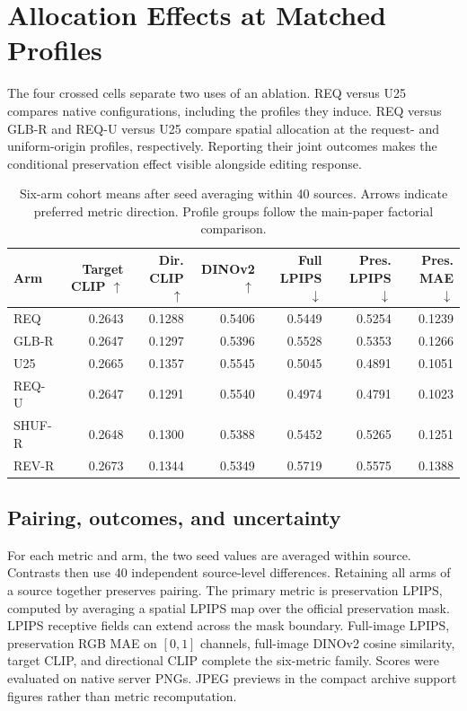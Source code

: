 \documentclass[10pt,doubleanonymous]{ieeeconf}
\begin{document}
\section{Allocation Effects at Matched Profiles}
The four crossed cells separate two uses of an ablation. REQ versus U25 compares native configurations, including the profiles they induce. REQ versus GLB-R and REQ-U versus U25 compare spatial allocation at the request- and uniform-origin profiles, respectively. Reporting their joint outcomes makes the conditional preservation effect visible alongside editing response.
\begin{table}[!t]
\centering\small
\caption{Six-arm cohort means after seed averaging within 40 sources. Arrows indicate preferred metric direction. Profile groups follow the main-paper factorial comparison.}
\label{tab:main-means}
\begin{tabular}{lrrrrrr}
\toprule
Arm & Target CLIP $\uparrow$ & Dir. CLIP $\uparrow$ & DINOv2 $\uparrow$ & Full LPIPS $\downarrow$ & Pres. LPIPS $\downarrow$ & Pres. MAE $\downarrow$\\
\midrule
REQ &0.2643&0.1288&0.5406&0.5449&0.5254&0.1239\\
GLB-R &0.2647&0.1297&0.5396&0.5528&0.5353&0.1266\\
U25 &0.2665&0.1357&0.5545&0.5045&0.4891&0.1051\\
REQ-U &0.2647&0.1291&0.5540&0.4974&0.4791&0.1023\\
SHUF-R &0.2648&0.1300&0.5388&0.5452&0.5265&0.1251\\
REV-R &0.2673&0.1344&0.5349&0.5719&0.5575&0.1388\\
\bottomrule
\end{tabular}
\end{table}
\subsection{Pairing, outcomes, and uncertainty}
For each metric and arm, the two seed values are averaged within source. Contrasts then use 40 independent source-level differences. Retaining all arms of a source together preserves pairing. The primary metric is preservation LPIPS, computed by averaging a spatial LPIPS map over the official preservation mask. LPIPS receptive fields can extend across the mask boundary. Full-image LPIPS, preservation RGB MAE on $[0,1]$ channels, full-image DINOv2 cosine similarity, target CLIP, and directional CLIP complete the six-metric family. Scores were evaluated on native server PNGs. JPEG previews in the compact archive support figures rather than metric recomputation.
\end{document}
